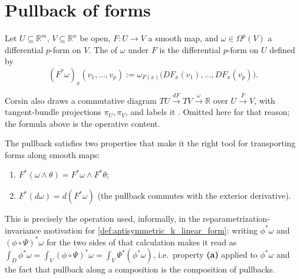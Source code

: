 

\section{Pullback of forms}
\label{sec:pullback_of_forms}

\begin{definition}
\label{def:pullback_of_forms}
Let $U \subseteq \mathbb{R}^m$, $V \subseteq \mathbb{R}^n$ be open, $F : U \to V$ a smooth
map, and $\omega \in \Omega^p(V)$ a differential $p$-form on $V$. The 
 of $\omega$ under $F$ is the differential $p$-form on $U$
defined by
\[(F^*\omega)_x(v_1,\ldots,v_p) := \omega_{F(x)}\big(DF_x(v_1),\ldots,DF_x(v_p)\big).\]
\end{definition}

\begin{ainote}
Corsin also draws a commutative diagram $TU \xrightarrow{dF} TV \xrightarrow{\omega} \mathbb{R}$
over $U \xrightarrow{F} V$, with tangent-bundle projections $\pi_U, \pi_V$, and labels it
. Omitted here for that reason; the formula above is the operative
content.
\end{ainote}

The pullback satisfies two properties that make it the right tool for transporting forms
along smooth maps:
\begin{enumerate}[label=\textbf{(\alph*)}]
  \item $F^*(\omega\wedge\theta) = F^*\omega \wedge F^*\theta$;
  \item $F^*(d\omega) = d(F^*\omega)$ (the pullback commutes with the exterior derivative).
\end{enumerate}

\begin{ainote}
This is precisely the operation used, informally, in the reparametrization-invariance
motivation for \cref{def:antisymmetric_k_linear_form}: writing $\phi^*\omega$ and
$(\phi\circ\Psi)^*\omega$ for the two sides of that calculation makes it read as $\int_D
\phi^*\omega = \int_V (\phi\circ\Psi)^*\omega = \int_V \Psi^*(\phi^*\omega)$, i.e.\ property
\textbf{(a)} applied to $\phi^*\omega$ and the fact that pullback along a composition is the
composition of
pullbacks.
\end{ainote}

